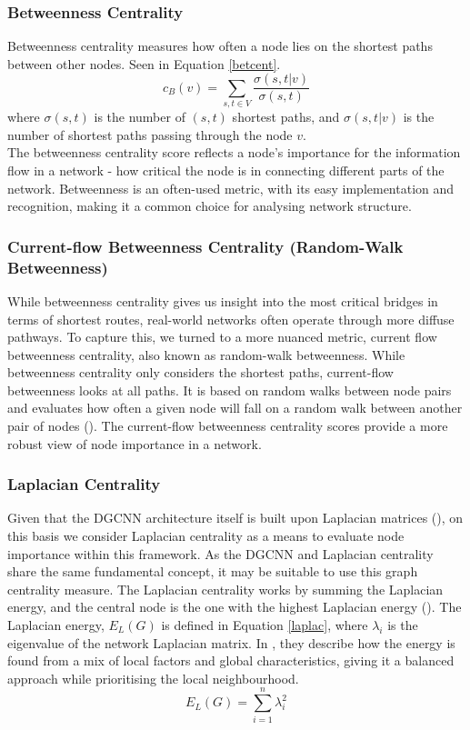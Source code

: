 \subsubsection{Betweenness Centrality}
Betweenness centrality measures how often a node lies on the shortest paths between other nodes. Seen in Equation \ref{betcent}.
\begin{equation}\label{betcent}
    c_B(v)=\displaystyle\sum_{s, t\in V}\dfrac{\sigma(s, t|v)}{\sigma(s, t)}
\end{equation}
where $\sigma (s, t)$ is the number of $(s, t)$ shortest paths, and $\sigma (s, t|v)$ is the number of shortest paths passing through the node $v$. 
\vspace{0.5em}\\
The betweenness centrality score reflects a node’s importance for the information flow in a network - how critical the node is in connecting different parts of the network. Betweenness is an often-used metric, with its easy implementation and recognition, making it a common choice for analysing network structure.
\subsubsection{Current-flow Betweenness Centrality (Random-Walk Betweenness)}
While betweenness centrality gives us insight into the most critical bridges in terms of shortest routes, real-world networks often operate through more diffuse pathways. To capture this, we turned to a more nuanced metric, current flow betweenness centrality, also known as random-walk betweenness. While betweenness centrality only considers the shortest paths, current-flow betweenness looks at all paths. It is based on random walks between node pairs and evaluates how often a given node will fall on a random walk between another pair of nodes (\cite{current-flow-betweenness}). The current-flow betweenness centrality scores provide a more robust view of node importance in a network.
\subsubsection{Laplacian Centrality}
Given that the DGCNN architecture itself is built upon Laplacian matrices (\cite{Song}), on this basis we consider Laplacian centrality as a means to evaluate node importance within this framework. As the DGCNN and Laplacian centrality share the same fundamental concept, it may be suitable to use this graph centrality measure. The Laplacian centrality works by summing the Laplacian energy, and the central node is the one with the highest Laplacian energy (\cite{laplacianCentre}).
The Laplacian energy, $E_L(G)$ is defined in Equation \ref{laplac}, where $\lambda_i$ is the eigenvalue of the network Laplacian matrix. In \cite{laplacianCentre}, they describe how the energy is found from a mix of local factors and global characteristics, giving it a balanced approach while prioritising the local neighbourhood.
\begin{equation}\label{laplac}
    E_L(G)=\displaystyle\sum_{i=1}^{n}\lambda^2_i
\end{equation}

